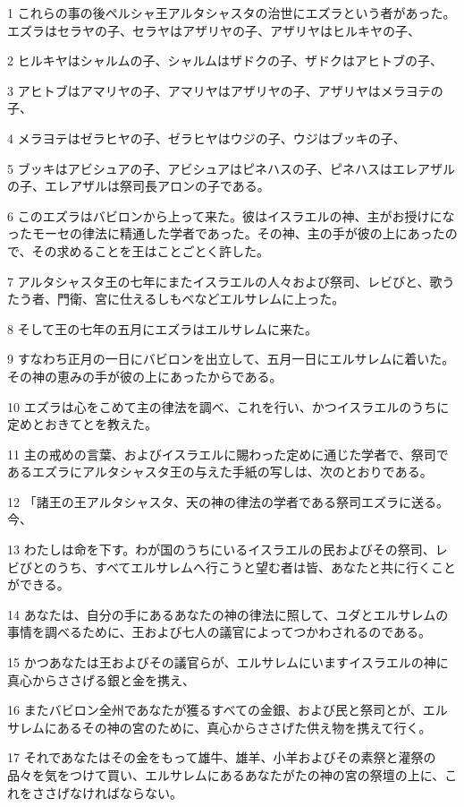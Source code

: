 \par 1 これらの事の後ペルシャ王アルタシャスタの治世にエズラという者があった。エズラはセラヤの子、セラヤはアザリヤの子、アザリヤはヒルキヤの子、
\par 2 ヒルキヤはシャルムの子、シャルムはザドクの子、ザドクはアヒトブの子、
\par 3 アヒトブはアマリヤの子、アマリヤはアザリヤの子、アザリヤはメラヨテの子、
\par 4 メラヨテはゼラヒヤの子、ゼラヒヤはウジの子、ウジはブッキの子、
\par 5 ブッキはアビシュアの子、アビシュアはピネハスの子、ピネハスはエレアザルの子、エレアザルは祭司長アロンの子である。
\par 6 このエズラはバビロンから上って来た。彼はイスラエルの神、主がお授けになったモーセの律法に精通した学者であった。その神、主の手が彼の上にあったので、その求めることを王はことごとく許した。
\par 7 アルタシャスタ王の七年にまたイスラエルの人々および祭司、レビびと、歌うたう者、門衛、宮に仕えるしもべなどエルサレムに上った。
\par 8 そして王の七年の五月にエズラはエルサレムに来た。
\par 9 すなわち正月の一日にバビロンを出立して、五月一日にエルサレムに着いた。その神の恵みの手が彼の上にあったからである。
\par 10 エズラは心をこめて主の律法を調べ、これを行い、かつイスラエルのうちに定めとおきてとを教えた。
\par 11 主の戒めの言葉、およびイスラエルに賜わった定めに通じた学者で、祭司であるエズラにアルタシャスタ王の与えた手紙の写しは、次のとおりである。
\par 12 「諸王の王アルタシャスタ、天の神の律法の学者である祭司エズラに送る。今、
\par 13 わたしは命を下す。わが国のうちにいるイスラエルの民およびその祭司、レビびとのうち、すべてエルサレムへ行こうと望む者は皆、あなたと共に行くことができる。
\par 14 あなたは、自分の手にあるあなたの神の律法に照して、ユダとエルサレムの事情を調べるために、王および七人の議官によってつかわされるのである。
\par 15 かつあなたは王およびその議官らが、エルサレムにいますイスラエルの神に真心からささげる銀と金を携え、
\par 16 またバビロン全州であなたが獲るすべての金銀、および民と祭司とが、エルサレムにあるその神の宮のために、真心からささげた供え物を携えて行く。
\par 17 それであなたはその金をもって雄牛、雄羊、小羊およびその素祭と灌祭の品々を気をつけて買い、エルサレムにあるあなたがたの神の宮の祭壇の上に、これをささげなければならない。

